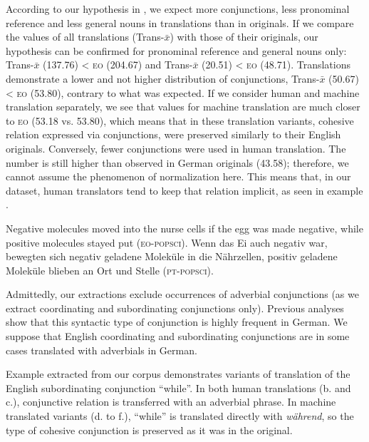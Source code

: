 \documentclass[output=paper]{LSP/langsci}
\begin{document}
According to our hypothesis in , we expect more conjunctions, less pronominal reference and less general nouns in translations than in originals. If we compare the values of all translations (Trans-$\bar{x}$) with those of their originals, our hypothesis can be confirmed for pronominal reference and general nouns only: Trans-$\bar{x}$ (137.76) < \textsc{eo} (204.67) and Trans-$\bar{x}$ (20.51) < \textsc{eo} (48.71). Translations demonstrate a lower and not higher distribution of conjunctions, Trans-$\bar{x}$ (50.67) < \textsc{eo} (53.80), contrary to what was expected. If we consider human and machine translation separately, we see that values for machine translation are much closer to \textsc{eo} (53.18 vs. 53.80), which means that in these translation variants, cohesive relation expressed via conjunctions, were preserved similarly to their English originals. Conversely, fewer conjunctions were used in human translation. The number is still higher than observed in German originals (43.58); therefore, we cannot assume the phenomenon of normalization here. This means that, in our dataset, human translators tend to keep that relation implicit, as seen in example .



\ea \label{ex:4:3}
\ea Negative molecules moved into the nurse cells if the egg was made negative, while positive molecules stayed put (\textsc{eo}-\textsc{popsci}).
\ex Wenn das Ei auch negativ war, bewegten sich negativ geladene Moleküle in die Nährzellen, positiv geladene Moleküle blieben an Ort und Stelle (\textsc{pt}-\textsc{popsci}).
\z
\z

Admittedly, our extractions exclude occurrences of adverbial conjunctions (as we extract coordinating and subordinating conjunctions only). Previous analyses \citep[e.g.][]{KunzLapshinova2014} show that this syntactic type of conjunction is highly frequent in German. We suppose that English coordinating and subordinating conjunctions are in some cases translated with adverbials in German. 

Example  extracted from our corpus demonstrates variants of translation of the English subordinating conjunction “while”. In both human translations (b. and c.), conjunctive relation is transferred with an adverbial phrase. In machine translated variants (d. to f.), “while” is translated directly with \textit{während}, so the type of cohesive conjunction is preserved as it was in the original.
\end{document}
